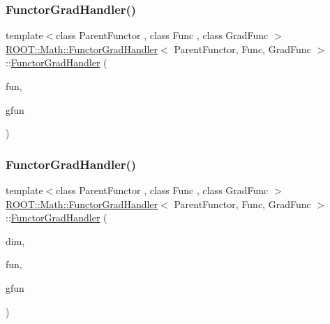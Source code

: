 \subsubsection{\texorpdfstring{FunctorGradHandler()}{FunctorGradHandler()}\hspace{0.1cm}{\footnotesize\ttfamily [3/4]}}
{\footnotesize\ttfamily template$<$class Parent\+Functor , class Func , class Grad\+Func $>$ \\
\mbox{\hyperlink{classROOT_1_1Math_1_1FunctorGradHandler}{R\+O\+O\+T\+::\+Math\+::\+Functor\+Grad\+Handler}}$<$ Parent\+Functor, Func, Grad\+Func $>$\+::\mbox{\hyperlink{classROOT_1_1Math_1_1FunctorGradHandler}{Functor\+Grad\+Handler}} (\begin{DoxyParamCaption}\item[{const Func \&}]{fun,  }\item[{const Grad\+Func \&}]{gfun }\end{DoxyParamCaption})\hspace{0.3cm}{\ttfamily [inline]}}

\mbox{\label{classROOT_1_1Math_1_1FunctorGradHandler_a5d5fdce3fadf4956e92c0057471e75a6}} 
\subsubsection{\texorpdfstring{FunctorGradHandler()}{FunctorGradHandler()}\hspace{0.1cm}{\footnotesize\ttfamily [4/4]}}
{\footnotesize\ttfamily template$<$class Parent\+Functor , class Func , class Grad\+Func $>$ \\
\mbox{\hyperlink{classROOT_1_1Math_1_1FunctorGradHandler}{R\+O\+O\+T\+::\+Math\+::\+Functor\+Grad\+Handler}}$<$ Parent\+Functor, Func, Grad\+Func $>$\+::\mbox{\hyperlink{classROOT_1_1Math_1_1FunctorGradHandler}{Functor\+Grad\+Handler}} (\begin{DoxyParamCaption}\item[{unsigned int}]{dim,  }\item[{const Func \&}]{fun,  }\item[{const Grad\+Func \&}]{gfun }\end{DoxyParamCaption})\hspace{0.3cm}{\ttfamily [inline]}}



